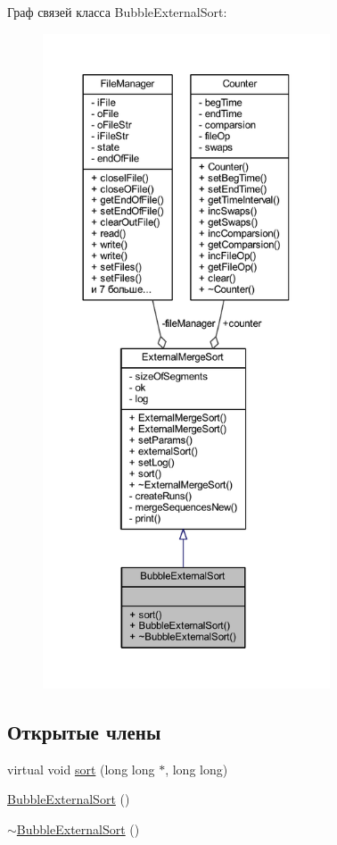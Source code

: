 Граф связей класса Bubble\+External\+Sort\+:\nopagebreak
\begin{figure}[H]
\begin{center}
\leavevmode
\includegraphics[height=550pt]{class_bubble_external_sort__coll__graph}
\end{center}
\end{figure}
\subsection*{Открытые члены}
\begin{DoxyCompactItemize}
\item 
virtual void \hyperlink{class_bubble_external_sort_ac2c8c1a8dad0f0f99a176d3641b7625c}{sort} (long long $\ast$, long long)
\item 
\hyperlink{class_bubble_external_sort_a420f93ff7677a75557f805749011f86e}{Bubble\+External\+Sort} ()
\item 
\hyperlink{class_bubble_external_sort_a2075c6e2117da937f397ceb993336e81}{$\sim$\+Bubble\+External\+Sort} ()
\end{DoxyCompactItemize}

